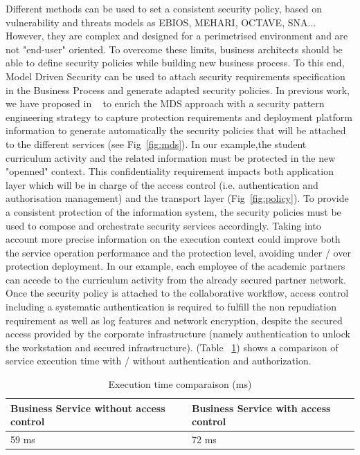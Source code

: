 \documentclass[runningheads,a4paper]{llncs}
\begin{document}
Different methods can be used to set a consistent security policy, based on vulnerability and threats models as EBIOS, MEHARI, OCTAVE, SNA... However, they are complex and designed for a perimetrised environment and are not "end-user" oriented. To overcome these limits, business architects should be able to define security policies while building new business process. To this end, Model Driven Security can be used to attach security requirements specification in the Business Process and generate adapted security policies. In previous work, we have proposed in ~\cite{OBG12} to enrich the MDS approach with a security pattern engineering strategy to capture protection requirements and deployment platform information to generate automatically the security policies that will be attached to the different services (see Fig~\ref{fig:mds}).
In our example,the student curriculum activity and the related information must be protected in the new "openned" context. This confidentiality requirement impacts both application layer which will be in charge of the access control (i.e. authentication and authorisation management) and the transport layer (Fig~\ref{fig:policy}). 
To provide a consistent protection of the information system, the security policies must be used to compose and orchestrate security services accordingly. Taking into account more precise information on the execution context could improve both the service operation performance and the protection level, avoiding under / over protection deployment. In our example, each employee of the academic partners can accede to the curriculum activity from the already secured partner network. Once the security policy is attached to the collaborative workflow, access control including a systematic authentication is required to fulfill the non repudiation requirement as well as log features and network encryption, despite the secured access provided by the corporate infrastructure (namely authentication to unlock the workstation and secured infrastructure). (Table ~\ref{tab:tab1}) shows a comparison of service execution time with / without authentication and authorization.
\begin{table}
\caption{Execution time comparaison (ms)}
\begin{tabular}{|l|l| }
\hline
Business Service without access control & Business Service with access control \\
  \hline
 59 ms & 72 ms\\
    \hline
\end{tabular}
\label{tab:tab1}
\end{table}
\end{document}
